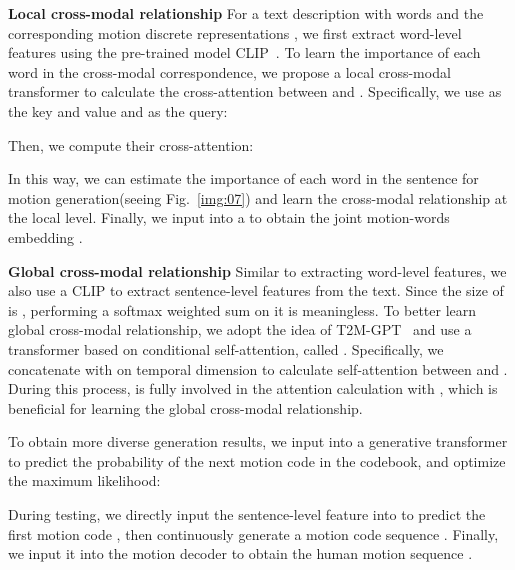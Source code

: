 \documentclass[10pt,twocolumn,letterpaper]{article}
\begin{document}
\textbf{Local cross-modal relationship}\quad
For a text description  with  words and the corresponding motion discrete representations , we first extract word-level features  using the pre-trained model CLIP~\cite{radford2021learning}. To learn the importance of each word in the cross-modal correspondence, we propose a local cross-modal transformer  to calculate the cross-attention between  and . Specifically, we use  as the key and value and  as the query:

Then, we compute their cross-attention:


In this way, we can estimate the importance of each word in the sentence for motion generation(seeing Fig.~\ref{img:07}) and learn the cross-modal relationship at the local level. Finally, we input  into a  to obtain the joint motion-words embedding .

\textbf{Global cross-modal relationship}\quad
Similar to extracting word-level features, we also use a CLIP to extract sentence-level features  from the text. Since the size of  is , performing a softmax weighted sum on it is meaningless. To better learn global cross-modal relationship, we adopt the idea of T2M-GPT~\cite{zhang2023t2m} and use a transformer based on conditional self-attention, called . Specifically, we concatenate  with  on temporal dimension to calculate self-attention between  and . During this process,  is fully involved in the attention calculation with , which is beneficial for learning the global cross-modal relationship. 

To obtain more diverse generation results, we input  into a generative transformer  to predict the probability  of the next motion code in the codebook, and optimize the maximum likelihood:



During testing, we directly input the sentence-level feature  into  to predict the first motion code , then continuously generate a motion code sequence . Finally, we input it into the motion decoder  to obtain the human motion sequence .
\end{document}
